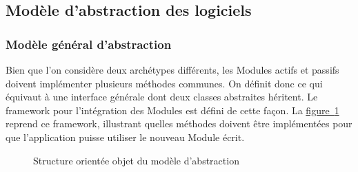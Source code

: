 \documentclass[]{article}
\newcommand{\wordlink}[2]{\hyperref[#1]{#2~\ref{#1}}}
\begin{document}

\subsection{Modèle d'abstraction des logiciels}
\label{abstrmodel}

\subsubsection{Modèle général d'abstraction}

Bien que l'on considère deux archétypes différents, les Modules actifs et passifs doivent implémenter plusieurs méthodes communes. On définit donc ce qui équivaut à une interface générale dont deux classes abstraites héritent. Le framework pour l'intégration des Modules est défini de cette façon. La \wordlink{abstrmodeldiag}{figure} reprend ce framework, illustrant quelles méthodes doivent être implémentées pour que l'application puisse utiliser le nouveau Module écrit.
\vspace{-0.4cm}
    \begin{figure}[!h]
       \noindent{}
       \caption{Structure orientée objet du modèle d'abstraction}
       \label{abstrmodeldiag}
    \end{figure}

\newpage
\end{document}
